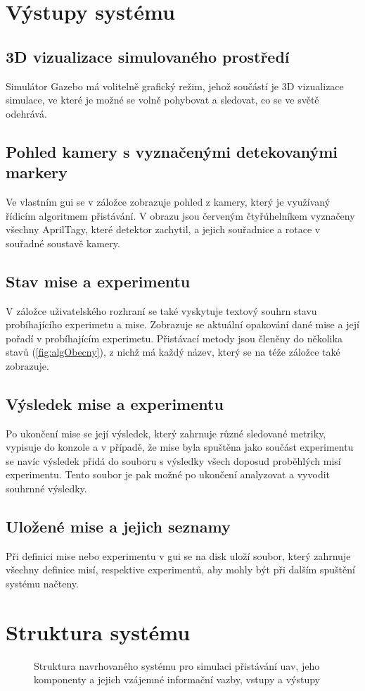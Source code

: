   \section{Výstupy systému} \label{sec:outputs}
    \subsection{3D vizualizace simulovaného prostředí}
      Simulátor Gazebo má volitelně grafický režim, jehož součástí je 3D vizualizace simulace, ve které je možné se volně pohybovat a sledovat, co se ve světě odehrává.
    \subsection{Pohled kamery s vyznačenými detekovanými markery}
      Ve vlastním \acrshort{gui} se v záložce  zobrazuje pohled z kamery, který je využívaný řídicím algoritmem přistávání. V obrazu jsou červeným čtyřúhelníkem vyznačeny všechny AprilTagy, které detektor zachytil, a jejich souřadnice a rotace v souřadné soustavě kamery.
    \subsection{Stav mise a experimentu}
      V záložce  uživatelského rozhraní se také vyskytuje textový souhrn stavu probíhajícího experimetu a mise. Zobrazuje se aktuální opakování dané mise a její pořadí v probíhajícím experimetu. Přistávací metody jsou členěny do několika stavů (\cref{fig:algObecny}), z nichž má každý název, který se na téže záložce také zobrazuje. %
    \subsection{Výsledek mise a experimentu}
      Po ukončení mise se její výsledek, který zahrnuje různé sledované metriky, %
      vypisuje do konzole a v případě, že mise byla spuštěna jako součást experimentu se navíc výsledek přidá do souboru s výsledky všech doposud proběhlých misí experimentu. Tento soubor je pak možné po ukončení analyzovat a vyvodit souhrnné výsledky.
    \subsection{Uložené mise a jejich seznamy}
      Při definici mise nebo experimentu v \acrshort{gui} se na disk uloží soubor, který zahrnuje všechny definice misí, respektive experimentů, aby mohly být při dalším spuštění systému načteny.
  \section{Struktura systému} \label{sec:structure}
    \begin{figure}
      \caption[Struktura navrhovaného systému]{Struktura navrhovaného systému pro simulaci přistávání \acrshort{uav}, jeho komponenty a jejich vzájemné informační vazby, vstupy a výstupy}
      \label{fig:offboardpidangle}
    \end{figure}